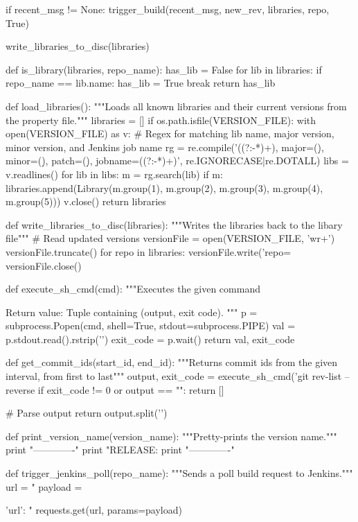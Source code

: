 \begin{pythoncode}[caption=Post-receive git hook for managing library releases and triggering Jenkins]
        if recent_msg != None:
            trigger_build(recent_msg, new_rev, libraries, repo, True)

    write_libraries_to_disc(libraries)

def is_library(libraries, repo_name):
    has_lib = False
    for lib in libraries:
        if repo_name == lib.name:
            has_lib = True
            break
    return has_lib

def load_libraries():
    """Loads all known libraries and their current versions from the property file."""
    libraries = []
    if os.path.isfile(VERSION_FILE):
        with open(VERSION_FILE) as v:
            # Regex for matching lib name, major version, minor version, and Jenkins job name
            rg = re.compile('((?:\w*-*)+), major=(\d*), minor=(\d*), patch=(\d*), jobname=((?:\w*-*)+)', re.IGNORECASE|re.DOTALL)
            libs = v.readlines()
            for lib in libs:
                m = rg.search(lib)
                if m:
                    libraries.append(Library(m.group(1), m.group(2), m.group(3), m.group(4), m.group(5)))
            v.close()
    return libraries

def write_libraries_to_disc(libraries):
    """Writes the libraries back to the libary file"""
    # Read updated versions
    versionFile = open(VERSION_FILE, 'wr+')
    versionFile.truncate()
    for repo in libraries:
        versionFile.write('repo=%
    versionFile.close()

def execute_sh_cmd(cmd):
    """Executes the given command

    Return value: Tuple containing (output, exit code).
    """
    p = subprocess.Popen(cmd, shell=True, stdout=subprocess.PIPE)
    val = p.stdout.read().rstrip('\n')
    exit_code = p.wait()
    return val, exit_code

def get_commit_ids(start_id, end_id):
    """Returns commit ids from the given interval, from first to last"""
    output, exit_code = execute_sh_cmd('git rev-list --reverse %
    if exit_code != 0 or output == "":
        return []

    # Parse output
    return output.split('\n')


def print_version_name(version_name):
    """Pretty-prints the version name."""
    print "-------------"
    print "RELEASE: %
    print "-------------"

def trigger_jenkins_poll(repo_name):
    """Sends a poll build request to Jenkins."""
    url = "%
    payload = {'url': "%
    requests.get(url, params=payload)

}
\end{pythoncode}
